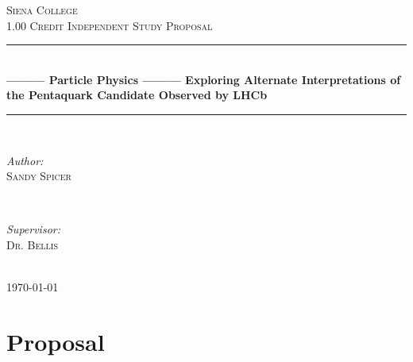 \documentclass[12pt]{article} %
\begin{document}

\begin{titlepage}

\newcommand{\HRule}{\rule{\linewidth}{0.5mm}} %

\center %

\textsc{\LARGE Siena College}\\[1.5cm] %
\textsc{\large 1.00 Credit Independent Study Proposal}\\[0.5cm] %
\HRule \\[0.5cm]
{ \huge \bfseries --------- Particle Physics  --------- Exploring Alternate Interpretations of the Pentaquark Candidate Observed by LHCb}\\[0.4cm] %
\HRule \\[1.5cm]

\begin{minipage}{0.4\textwidth}
\begin{flushleft} \large
\emph{Author:}\\
\textsc{Sandy Spicer} %
\end{flushleft}
\end{minipage}
~
\begin{minipage}{0.4\textwidth}
\begin{flushright} \large
\emph{Supervisor:} \\
\textsc{Dr. Bellis} %
\end{flushright}
\end{minipage}\\[4cm]

{\large \today}\\[3cm] %

\vfill %

\end{titlepage}


\section{Proposal} %
\end{document}
